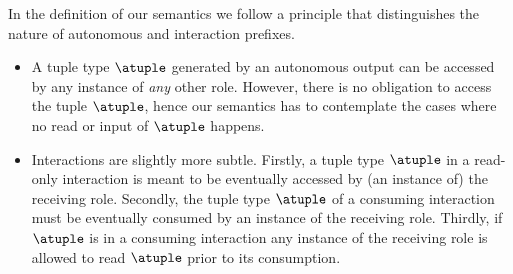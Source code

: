 \bigskip

In the definition of our semantics we follow a principle that
distinguishes the nature of autonomous and interaction prefixes.
\begin{itemize}
\item A tuple type $\atuple$ generated by an autonomous output can
  be accessed by any instance of \emph{any} other role.
  However, there is no obligation to access the tuple $\atuple$, hence
  our semantics has to contemplate the cases where no read or input of
  $\atuple$ happens.
\item Interactions are slightly more subtle.
  Firstly, a tuple type $\atuple$ in a read-only interaction is meant
  to be eventually accessed by (an instance of) the receiving role.
  Secondly, the tuple type $\atuple$ of a consuming interaction must
  be eventually consumed by an instance of the receiving role.
  Thirdly, if $\atuple$ is in a consuming interaction any instance of
  the receiving role is allowed to read $\atuple$ prior to its
  consumption.
\end{itemize}

